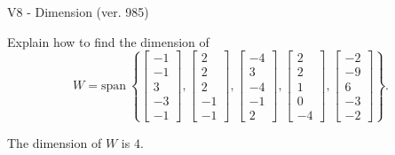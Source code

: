 \begin{exercise}
  \begin{exerciseTitle}V8 - Dimension (ver. 985)\end{exerciseTitle}
  \begin{exerciseStatement}
    Explain how to find the dimension of 
\[W=\mathrm{span}\ \left\{\left[\begin{array}{r}
-1 \\
-1 \\
3 \\
-3 \\
-1
\end{array}\right] , \left[\begin{array}{r}
2 \\
2 \\
2 \\
-1 \\
-1
\end{array}\right] , \left[\begin{array}{r}
-4 \\
3 \\
-4 \\
-1 \\
2
\end{array}\right] , \left[\begin{array}{r}
2 \\
2 \\
1 \\
0 \\
-4
\end{array}\right] , \left[\begin{array}{r}
-2 \\
-9 \\
6 \\
-3 \\
-2
\end{array}\right]\right\}.\]



  \end{exerciseStatement}
  \begin{exerciseAnswer}
   The dimension of \(W\) is  \(4\).
  


  \end{exerciseAnswer}
\end{exercise}